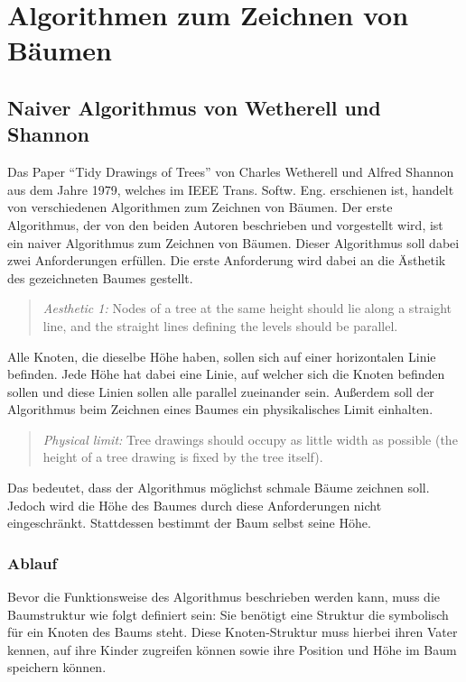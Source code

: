 \chapter{Algorithmen zum Zeichnen von Bäumen}
\label{chap:kapitel3}

\section{Naiver Algorithmus von Wetherell und Shannon}

Das Paper “Tidy Drawings of Trees” von Charles Wetherell und Alfred Shannon aus dem Jahre 1979, 
welches im IEEE Trans. Softw. Eng. erschienen ist, handelt von verschiedenen Algorithmen zum Zeichnen von Bäumen.
Der erste Algorithmus, der von den beiden Autoren beschrieben und vorgestellt wird, ist ein naiver Algorithmus 
zum Zeichnen von Bäumen. Dieser Algorithmus soll dabei zwei Anforderungen erfüllen. Die erste Anforderung wird dabei
an die Ästhetik des gezeichneten Baumes gestellt. 
\begin{quotation}
	\textit{Aesthetic 1:} Nodes of a tree at the same height should lie
	along a straight line, and the straight lines defining the levels
	should be parallel.\cite[]{q1}
\end{quotation}
Alle Knoten, die dieselbe Höhe haben, sollen sich auf einer horizontalen
Linie befinden. Jede Höhe hat dabei eine Linie, auf welcher sich die Knoten befinden sollen und diese Linien sollen alle
parallel zueinander sein. Außerdem soll der Algorithmus beim Zeichnen eines Baumes ein physikalisches Limit einhalten.
\begin{quotation}
	\textit{Physical limit:} Tree drawings should occupy as little width
	as possible (the height of a tree drawing is fixed by the tree
	itself).\cite[]{q1}
\end{quotation}
Das bedeutet, dass der Algorithmus möglichst schmale Bäume zeichnen soll. Jedoch wird die Höhe des Baumes durch diese Anforderungen
nicht eingeschränkt. Stattdessen bestimmt der Baum selbst seine Höhe. \cite[]{q1}

\label{chap:kapitel3_1_Ablauf}
\subsection{Ablauf}
Bevor die Funktionsweise des Algorithmus beschrieben werden kann, muss die Baumstruktur 
wie folgt definiert sein: Sie benötigt eine Struktur die symbolisch für ein Knoten des Baums steht. 
Diese Knoten-Struktur muss hierbei ihren Vater kennen, auf ihre Kinder zugreifen können sowie ihre Position und
Höhe im Baum speichern können.

